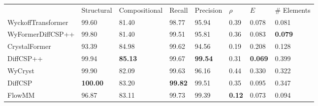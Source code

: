 \begin{tabular}{llllllll}
{} & {Structural} & {Compositional} & {Recall} & {Precision} & {$\rho$} & {$E$} & {# Elements} \\
WyckoffTransformer & 99.60 & 81.40 & 98.77 & 95.94 & 0.39 & 0.078 & 0.081 \\
WyFormerDiffCSP++ & 99.80 & 81.40 & 99.51 & 95.81 & 0.36 & 0.083 & \bfseries 0.079 \\
CrystalFormer & 93.39 & 84.98 & 99.62 & 94.56 & 0.19 & 0.208 & 0.128 \\
DiffCSP++ & 99.94 & \bfseries 85.13 & 99.67 & \bfseries 99.54 & 0.31 & \bfseries 0.069 & 0.399 \\
WyCryst & 99.90 & 82.09 & 99.63 & 96.16 & 0.44 & 0.330 & 0.322 \\
DiffCSP & \bfseries 100.00 & 83.20 & \bfseries 99.82 & 99.51 & 0.35 & 0.095 & 0.347 \\
FlowMM & 96.87 & 83.11 & 99.73 & 99.39 & \bfseries 0.12 & 0.073 & 0.094 \\
\end{tabular}
